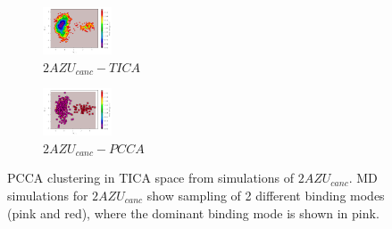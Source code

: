 \begin{figure}[!ht]
\centering
\begin{subfigure}{.5\textwidth}
  \centering
  \includegraphics[width=.9\linewidth]{chapter4/2AZU_canc/2AZU_canc-tica.pdf}
  \caption{$2AZU_{canc}-TICA$}
  \label{sup:2AZU_canc-tica}
\end{subfigure}%
\begin{subfigure}{.5\textwidth}
  \centering
  \includegraphics[width=.9\linewidth]{chapter4/2AZU_canc/2AZU_canc-pcca.pdf}
  \caption{$2AZU_{canc}-PCCA$}
  \label{sup:2AZU_canc-pcca}
\end{subfigure}
\caption[PCCA Clustering of $2AZU_{canc}$]{PCCA clustering in TICA space from simulations of $2AZU_{canc}$. MD simulations for $2AZU_{canc}$ show sampling of 2 different binding modes (pink and red), where the dominant binding mode is shown in pink.}
\label{sup:2AZU_canc-cluster}
\end{figure}

